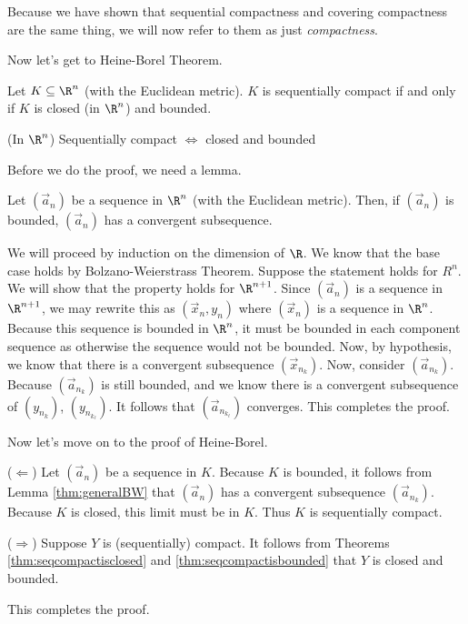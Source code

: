 \documentclass[class=article, crop=false]{standalone}
\begin{document}
Because we have shown that sequential compactness and covering compactness are the same thing, we will now refer to them as just \textit{compactness}.

Now let's get to Heine-Borel Theorem.

\begin{thm}
    Let $K \subseteq \R^n$ (with the Euclidean metric). $K$ is sequentially compact if and only if $K$ is closed (in $\R^n$) and bounded.
\end{thm}
\begin{slogan}
    (In $\R^n$) Sequentially compact $\iff$ closed and bounded
\end{slogan}

Before we do the proof, we need a lemma.

\begin{thm}{\label{thm:generalBW}}
    Let $(\vec a_n)$ be a sequence in $\R^n$ (with the Euclidean metric). Then, if $(\vec a_n)$ is bounded, $(\vec a_n)$ has a convergent subsequence.
\end{thm}
\begin{pf}
    We will proceed by induction on the dimension of $\R$. We know that the base case holds by Bolzano-Weierstrass Theorem. Suppose the statement holds for $R^n$. We will show that the property holds for $\R^{n+1}$.
    Since $(\vec a_n)$ is a sequence in $\R^{n+1}$, we may rewrite this as $(\vec x_n, y_n)$ where $(\vec x_n)$ is a sequence in $\R^n$. Because this sequence is bounded in $\R^n$, it must be bounded in each component sequence as otherwise the sequence would not be bounded. Now, by hypothesis, we know that there is a convergent subsequence $(\vec x_{n_k})$. Now, consider $(\vec a_{n_k})$. Because $(\vec a_{n_k})$ is still bounded, and we know there is a convergent subsequence of
    $(y_{n_k})$, $(y_{n_{k_\ell}})$. It follows that $(\vec a_{n_{k_\ell}})$ converges. This completes the proof.
\end{pf}



Now let's move on to the proof of Heine-Borel.
\begin{pf}
    ($\Leftarrow$) Let $(\vec a_n)$ be a sequence in $K$. Because $K$ is bounded, it follows from Lemma \ref{thm:generalBW} that $(\vec a_n)$ has a convergent subsequence $(\vec a_{n_k})$. Because $K$ is closed, this limit must be in $K$. Thus $K$ is sequentially compact.

    ($\Rightarrow$) Suppose $Y$ is (sequentially) compact. It follows from Theorems \ref{thm:seqcompactisclosed} and \ref{thm:seqcompactisbounded} that $Y$ is closed and bounded.

    This completes the proof.
\end{pf}
\end{document}
